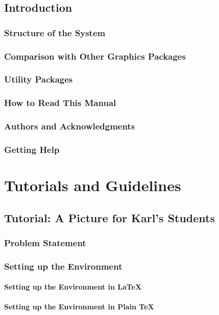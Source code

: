 \documentclass{memoir}
\begin{document}
\chapter{Introduction}
\lipsum
\section[Structure]{Structure of the System}
\lipsum
\section[Comparison]{Comparison with Other Graphics Packages}
\lipsum
\section{Utility Packages}
\lipsum
\section[How to Read]{How to Read This Manual}
\lipsum
\section[Acknowledgments]{Authors and Acknowledgments}
\lipsum
\section[Help]{Getting Help}
\lipsum
\part{Tutorials and Guidelines}
\chapter[Karl's Students]{Tutorial: A Picture for Karl's Students}
\lipsum
\section[Problem]{Problem Statement}
\lipsum
\section[Setting Up]{Setting up the Environment}
\lipsum
\subsection[\LaTeX]{Setting up the Environment in \LaTeX}
\lipsum
\subsection[\TeX]{Setting up the Environment in Plain \TeX}
\lipsum
\end{document}
